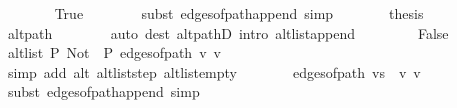 \begin{isabellebody}
\ \ \ \ \ \ \isamarkupfalse%
\ True\isanewline
\ \ \ \ \ \ \isamarkupfalse%
\ {\isacharparenleft}{\kern0pt}subst\ edges{\isacharunderscore}{\kern0pt}of{\isacharunderscore}{\kern0pt}path{\isacharunderscore}{\kern0pt}append{\isacharunderscore}{\kern0pt}{}{\isacharparenright}{\kern0pt}\ simp{\isacharplus}{\kern0pt}\isanewline
\ \ \ \ \isamarkupfalse%
\ \isamarkupfalse%
\ {\isacharquery}{\kern0pt}thesis\isanewline
\ \ \ \ \ \ \isamarkupfalse%
\ alt{\isacharunderscore}{\kern0pt}path\isanewline
\ \ \ \ \ \ \isamarkupfalse%
\ {\isacharparenleft}{\kern0pt}auto\ dest{\isacharcolon}{\kern0pt}\ alt{\isacharunderscore}{\kern0pt}pathD{\isacharparenleft}{\kern0pt}{}{\isacharparenright}{\kern0pt}\ intro{\isacharcolon}{\kern0pt}\ alt{\isacharunderscore}{\kern0pt}list{\isacharunderscore}{\kern0pt}append{\isacharunderscore}{\kern0pt}{}{\isacharprime}{\kern0pt}{\isacharparenright}{\kern0pt}\isanewline
\ \ \isamarkupfalse%
\isanewline
\ \ \ \ \isamarkupfalse%
\ False\isanewline
\ \ \ \ \isamarkupfalse%
\ {\isachardoublequoteopen}alt{\isacharunderscore}{\kern0pt}list\ P\ {\isacharparenleft}{\kern0pt}Not\ {\isasymcirc}\ P{\isacharparenright}{\kern0pt}\ {\isacharparenleft}{\kern0pt}edges{\isacharunderscore}{\kern0pt}of{\isacharunderscore}{\kern0pt}path\ {\isacharbrackleft}{\kern0pt}v{\isacharprime}{\kern0pt}{\isacharcomma}{\kern0pt}\ v{\isacharbrackright}{\kern0pt}{\isacharparenright}{\kern0pt}{\isachardoublequoteclose}\isanewline
\ \ \ \ \ \ \isamarkupfalse%
\ {\isacharparenleft}{\kern0pt}simp\ add{\isacharcolon}{\kern0pt}\ alt\ alt{\isacharunderscore}{\kern0pt}list{\isacharunderscore}{\kern0pt}step\ alt{\isacharunderscore}{\kern0pt}list{\isacharunderscore}{\kern0pt}empty{\isacharparenright}{\kern0pt}\isanewline
\ \ \ \ \isamarkupfalse%
\ \isamarkupfalse%
\ {\isachardoublequoteopen}edges{\isacharunderscore}{\kern0pt}of{\isacharunderscore}{\kern0pt}path\ {\isacharparenleft}{\kern0pt}vs\ {\isacharat}{\kern0pt}\ {\isacharbrackleft}{\kern0pt}v{\isacharprime}{\kern0pt}{\isacharprime}{\kern0pt}{\isacharcomma}{\kern0pt}\ v{\isacharprime}{\kern0pt}{\isacharbrackright}{\kern0pt}{\isacharparenright}{\kern0pt}\ {\isasymnoteq}\ {\isacharbrackleft}{\kern0pt}{\isacharbrackright}{\kern0pt}{\isachardoublequoteclose}\isanewline
\ \ \ \ \ \ \isamarkupfalse%
\ {\isacharparenleft}{\kern0pt}subst\ edges{\isacharunderscore}{\kern0pt}of{\isacharunderscore}{\kern0pt}path{\isacharunderscore}{\kern0pt}append{\isacharunderscore}{\kern0pt}{}{\isacharparenright}{\kern0pt}\ simp{\isacharplus}{\kern0pt}\isanewline

\end{isabellebody}
